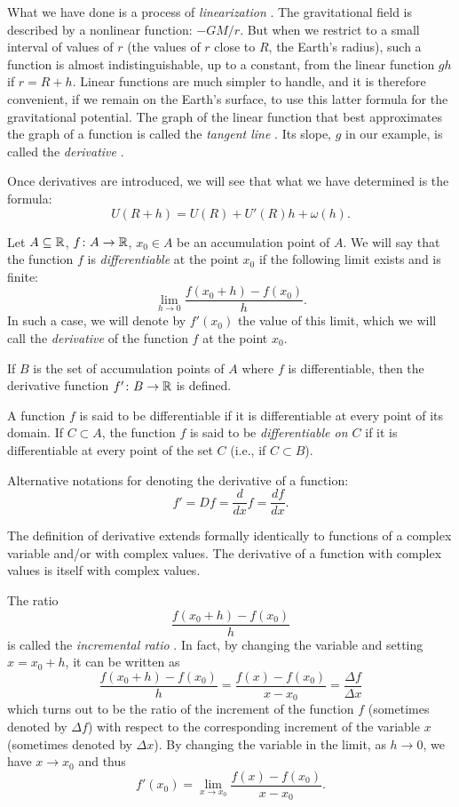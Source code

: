 What we have done is a process of \emph{linearization}%
%
. 
The gravitational field is described by a nonlinear function: $-GM/r$.
But when we restrict to a small interval of values of $r$ 
(the values of $r$ close to $R$, the Earth's radius), such a function 
is almost indistinguishable, up to a constant, from the linear function 
$gh$ if $r=R+h$.
Linear functions are much simpler to handle, and it is therefore convenient, 
if we remain on the Earth's surface, to use this latter formula for 
the gravitational potential.
The graph of the linear function that best approximates the graph of a 
function is called the \emph{tangent line}%
%
. 
Its slope, $g$ in our example, is called the \emph{derivative}%
%
.

Once derivatives are introduced, we will see that what we have
determined is the formula:
\[
U(R+h) = U(R) + U'(R) h + \omega(h).
\]

\begin{definition}[derivative]
\mymark{***}%
Let $A\subseteq {\mathbb R}$, $f\colon A \to {\mathbb R}$, 
$x_0\in A$ be an accumulation point of $A$.
We will say that the function $f$ is \emph{differentiable} at the point $x_0$ if
the following limit exists and is finite:
\[
  \lim_{h\to 0} \frac{f(x_0+h) - f(x_0)}{h}.
\]
In such a case, we will denote by $f'(x_0)$ the value of this limit, which we
will call the \emph{derivative}%
%
 of the function $f$ at the point $x_0$.

If $B$ is the set of accumulation points of $A$ where $f$ is differentiable,
then the derivative function $f'\colon B \to {\mathbb R}$ is defined.

A function $f$ is said to be differentiable if it is differentiable at every
point of its domain.
If $C\subset A$, the function $f$ is said to be \emph{differentiable on $C$} if
it is differentiable at every point of the set $C$ (i.e., if $C\subset B$).

Alternative notations for denoting the derivative of a function:
\[
  f' = Df = \frac{d}{dx} f = \frac{df}{dx}.
\]

The definition of derivative extends formally identically 
to functions of a complex variable and/or with complex values.
The derivative of a function with complex values is
itself with complex values.
\end{definition}

The ratio
\[
\frac{f(x_0+h) - f(x_0)}{h}
\]
is called the \emph{incremental ratio}%
%
. In fact, by changing the variable and setting $x=x_0+h$, it can be written as
\[
\frac{f(x_0+h) - f(x_0)}{h}
= \frac{f(x) - f(x_0)}{x-x_0}
= \frac{\Delta f}{\Delta x}
\]
which turns out to be the ratio of the increment of the function $f$ (sometimes
denoted by $\Delta f$) with respect to the corresponding increment of the
variable $x$ (sometimes denoted by $\Delta x$).
By changing the variable in the limit, as $h\to 0$, we have $x\to x_0$
and thus
\[
 f'(x_0) = \lim_{x\to x_0} \frac{f(x)-f(x_0)}{x-x_0}.
\]


